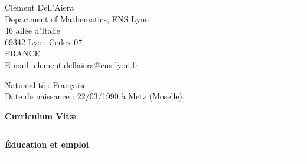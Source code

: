 \documentclass[a4paper,11pt]{article}
\newcommand{\titre}[1]{%
	\begin{center}
	\bigskip
	\rule{\textwidth}{1pt}
	\par\vspace{0.1cm}
        \textbf{\large #1}
	\par\rule{\textwidth}{1pt}
	\end{center}
	\bigskip
	}
\begin{document}
\begin{flushleft}
Clément Dell'Aiera \\
Department of Mathematics, ENS Lyon\\
46 allée d’Italie\\
69342 Lyon Cedex 07\\
FRANCE\\

\medskip
E-mail: clement.dellaiera@ens-lyon.fr

\end{flushleft}
\begin{flushleft}
Nationalit\'e : Fran\c{c}aise \\
Date de naissance : 22/03/1990 \`{a} Metz (Moselle).
\end{flushleft}

\vspace{1.5cm}
\begin{center}
\par\huge{\textbf{Curriculum Vit\ae} }
\end{center}

\titre{\'{E}ducation et emploi}
\end{document}

